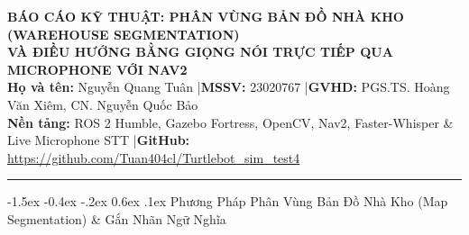 \documentclass[10pt,a4paper]{article}
\makeatletter
\renewcommand{\section}{\@startsection{section}{1}{\z@}%
  {-1.5ex \@plus -0.4ex \@minus -.2ex}%
  {0.6ex \@plus .1ex}%
  {\normalfont\normalsize\bfseries\color{primary}}}
\makeatother
\begin{document}
\begin{center}
  {\large\bfseries\color{primary} BÁO CÁO KỸ THUẬT: PHÂN VÙNG BẢN ĐỒ NHÀ KHO (WAREHOUSE SEGMENTATION)}\\[2pt]
  {\large\bfseries\color{primary} VÀ ĐIỀU HƯỚNG BẰNG GIỌNG NÓI TRỰC TIẾP QUA MICROPHONE VỚI NAV2}\\[3pt]
  {\footnotesize \textbf{Họ và tên:} Nguyễn Quang Tuân \quad|\quad \textbf{MSSV:} 23020767 \quad|\quad \textbf{GVHD:} PGS.TS. Hoàng Văn Xiêm, CN. Nguyễn Quốc Bảo}\\
  {\footnotesize \textbf{Nền tảng:} ROS 2 Humble, Gazebo Fortress, OpenCV, Nav2, Faster-Whisper \& Live Microphone STT \quad|\quad \textbf{GitHub:} \url{https://github.com/Tuan404cl/Turtlebot_sim_test4}}
\end{center}
\vspace{-5pt}
\noindent\textcolor{primary}{\rule{\linewidth}{0.8pt}}

\section{Phương Pháp Phân Vùng Bản Đồ Nhà Kho (Map Segmentation) \& Gắn Nhãn Ngữ Nghĩa}
\end{document}
